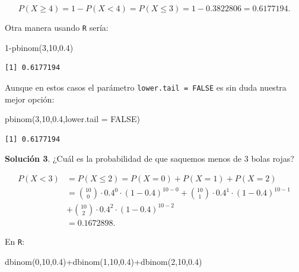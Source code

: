 \documentclass[
  letterpaper,
  DIV=11,
  numbers=noendperiod]{scrreprt}
\newenvironment{Shaded}{\begin{snugshade}}{\end{snugshade}}
\newcommand{\AttributeTok}[1]{\textcolor[rgb]{0.40,0.45,0.13}{#1}}
\newcommand{\ConstantTok}[1]{\textcolor[rgb]{0.56,0.35,0.01}{#1}}
\newcommand{\DecValTok}[1]{\textcolor[rgb]{0.68,0.00,0.00}{#1}}
\newcommand{\FloatTok}[1]{\textcolor[rgb]{0.68,0.00,0.00}{#1}}
\newcommand{\FunctionTok}[1]{\textcolor[rgb]{0.28,0.35,0.67}{#1}}
\newcommand{\NormalTok}[1]{\textcolor[rgb]{0.00,0.23,0.31}{#1}}
\newcommand{\SpecialCharTok}[1]{\textcolor[rgb]{0.37,0.37,0.37}{#1}}
\begin{document}
\[P(X \geq 4 )=1-P(X< 4)=P(X\leq 3)=1-0.3822806=0.6177194.\]

Otra manera usando \texttt{R} sería:

\begin{Shaded}
\begin{Highlighting}[]
\DecValTok{1}\SpecialCharTok{{-}}\FunctionTok{pbinom}\NormalTok{(}\DecValTok{3}\NormalTok{,}\DecValTok{10}\NormalTok{,}\FloatTok{0.4}\NormalTok{)}
\end{Highlighting}
\end{Shaded}

\begin{verbatim}
[1] 0.6177194
\end{verbatim}

Aunque en estos casos el parámetro \texttt{lower.tail\ =\ FALSE} es sin
duda nuestra mejor opción:

\begin{Shaded}
\begin{Highlighting}[]
\FunctionTok{pbinom}\NormalTok{(}\DecValTok{3}\NormalTok{,}\DecValTok{10}\NormalTok{,}\FloatTok{0.4}\NormalTok{,}\AttributeTok{lower.tail =} \ConstantTok{FALSE}\NormalTok{)}
\end{Highlighting}
\end{Shaded}

\begin{verbatim}
[1] 0.6177194
\end{verbatim}

\textbf{Solución 3}. ¿Cuál es la probabilidad de que saquemos menos de
\(3\) bolas rojas?

\[
\begin{array}{ll}
P(X< 3)&= P(X\leq 2)=  P(X=0)+P(X=1)+P(X=2)\\
&=
{10\choose 0}\cdot 0.4^0\cdot (1-0.4)^{10-0}+ {10\choose 1}\cdot 0.4^1\cdot (1-0.4)^{10-1}\\
&+
{10\choose 2}\cdot 0.4^2\cdot (1-0.4)^{10-2}\\
&=0.1672898.
\end{array}
\]

En \texttt{R}:

\begin{Shaded}
\begin{Highlighting}[]
\FunctionTok{dbinom}\NormalTok{(}\DecValTok{0}\NormalTok{,}\DecValTok{10}\NormalTok{,}\FloatTok{0.4}\NormalTok{)}\SpecialCharTok{+}\FunctionTok{dbinom}\NormalTok{(}\DecValTok{1}\NormalTok{,}\DecValTok{10}\NormalTok{,}\FloatTok{0.4}\NormalTok{)}\SpecialCharTok{+}\FunctionTok{dbinom}\NormalTok{(}\DecValTok{2}\NormalTok{,}\DecValTok{10}\NormalTok{,}\FloatTok{0.4}\NormalTok{)}
\end{Highlighting}
\end{Shaded}
\end{document}
